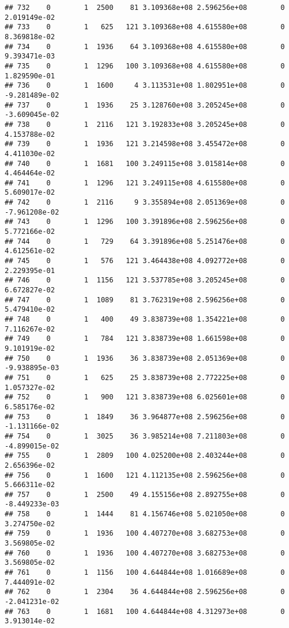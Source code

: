 \documentclass[
]{article}
\begin{document}
\begin{enumerate}
\begin{verbatim}
## 732    0        1  2500    81 3.109368e+08 2.596256e+08        0  2.019149e-02
## 733    0        1   625   121 3.109368e+08 4.615580e+08        0  8.369818e-02
## 734    0        1  1936    64 3.109368e+08 4.615580e+08        0  9.393471e-03
## 735    0        1  1296   100 3.109368e+08 4.615580e+08        0  1.829590e-01
## 736    0        1  1600     4 3.113531e+08 1.802951e+08        0 -9.281489e-02
## 737    0        1  1936    25 3.128760e+08 3.205245e+08        0 -3.609045e-02
## 738    0        1  2116   121 3.192833e+08 3.205245e+08        0  4.153788e-02
## 739    0        1  1936   121 3.214598e+08 3.455472e+08        0  4.411030e-02
## 740    0        1  1681   100 3.249115e+08 3.015814e+08        0  4.464464e-02
## 741    0        1  1296   121 3.249115e+08 4.615580e+08        0  5.609017e-02
## 742    0        1  2116     9 3.355894e+08 2.051369e+08        0 -7.961208e-02
## 743    0        1  1296   100 3.391896e+08 2.596256e+08        0  5.772166e-02
## 744    0        1   729    64 3.391896e+08 5.251476e+08        0  4.612561e-02
## 745    0        1   576   121 3.464438e+08 4.092772e+08        0  2.229395e-01
## 746    0        1  1156   121 3.537785e+08 3.205245e+08        0  6.672827e-02
## 747    0        1  1089    81 3.762319e+08 2.596256e+08        0  5.479410e-02
## 748    0        1   400    49 3.838739e+08 1.354221e+08        0  7.116267e-02
## 749    0        1   784   121 3.838739e+08 1.661598e+08        0  9.101919e-02
## 750    0        1  1936    36 3.838739e+08 2.051369e+08        0 -9.938895e-03
## 751    0        1   625    25 3.838739e+08 2.772225e+08        0  1.057327e-02
## 752    0        1   900   121 3.838739e+08 6.025601e+08        0  6.585176e-02
## 753    0        1  1849    36 3.964877e+08 2.596256e+08        0 -1.131166e-02
## 754    0        1  3025    36 3.985214e+08 7.211803e+08        0 -4.899015e-02
## 755    0        1  2809   100 4.025200e+08 2.403244e+08        0  2.656396e-02
## 756    0        1  1600   121 4.112135e+08 2.596256e+08        0  5.666311e-02
## 757    0        1  2500    49 4.155156e+08 2.892755e+08        0 -8.449233e-03
## 758    0        1  1444    81 4.156746e+08 5.021050e+08        0  3.274750e-02
## 759    0        1  1936   100 4.407270e+08 3.682753e+08        0  3.569805e-02
## 760    0        1  1936   100 4.407270e+08 3.682753e+08        0  3.569805e-02
## 761    0        1  1156   100 4.644844e+08 1.016689e+08        0  7.444091e-02
## 762    0        1  2304    36 4.644844e+08 2.596256e+08        0 -2.041231e-02
## 763    0        1  1681   100 4.644844e+08 4.312973e+08        0  3.913014e-02

\end{verbatim}
\end{enumerate}
\end{document}
